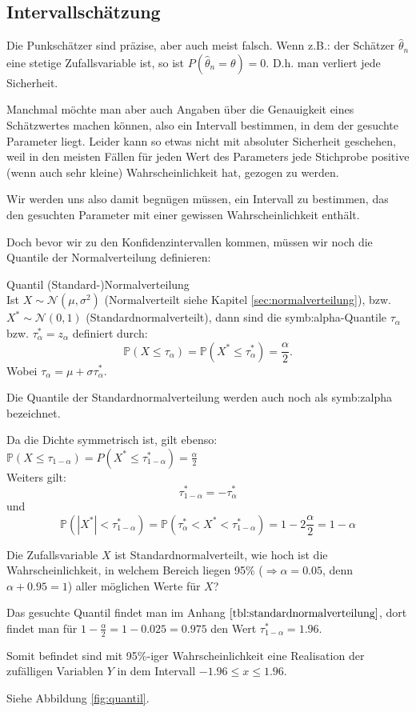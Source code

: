 
\subsection{Intervallschätzung}
Die Punkschätzer sind präzise, aber auch meist falsch. Wenn z.B.: der Schätzer $\hat\theta_n$ eine stetige Zufallsvariable ist, so ist $P(\hat\theta_n=\theta)=0$. D.h. man verliert jede Sicherheit.

Manchmal möchte man aber auch Angaben über die Genauigkeit eines Schätzwertes
machen können, also ein Intervall bestimmen, in dem der gesuchte Parameter
liegt. Leider kann so etwas nicht mit absoluter Sicherheit geschehen, weil
in den meisten Fällen für jeden Wert des Parameters jede Stichprobe
positive (wenn auch sehr kleine) Wahrscheinlichkeit hat, gezogen zu werden.

Wir werden uns also damit begnügen müssen, ein Intervall zu bestimmen,
das den gesuchten Parameter mit einer gewissen Wahrscheinlichkeit enthält.

Doch bevor wir zu den Konfidenzintervallen kommen, müssen wir noch die Quantile der Normalverteilung definieren:
\begin{definition}Quantil (Standard-)Normalverteilung\\\label{def:quantil_normalverteilung}
Ist $X\sim\mathcal N(\mu, \sigma^2)$ (Normalverteilt siehe Kapitel \ref{sec:normalverteilung}), bzw. $X^*\sim\mathcal N(0, 1)$ (Standardnormalverteilt), dann sind die \gls{symb:alpha}-Quantile $\tau_\alpha$ bzw. $\tau_\alpha^*=z_\alpha$ definiert durch:
\[\mathbb P(X\leq\tau_\alpha)=\mathbb P(X^*\leq\tau_\alpha^*)=\frac{\alpha}{2}.\]
Wobei $\tau_\alpha=\mu+\sigma\tau_\alpha^*$.

Die Quantile der Standardnormalverteilung werden auch noch als \gls{symb:zalpha} bezeichnet.
\end{definition}
Da die Dichte symmetrisch ist, gilt ebenso: $\mathbb P(X\leq\tau_{1-\alpha})=P(X^*\leq\tau_{1-\alpha}^*)=\frac{\alpha}{2}$\\
Weiters gilt: 
\[\tau_{1-\alpha}^*=-\tau_\alpha^*\]
und
\[\mathbb P(|X^*|<\tau_{1-\alpha}^*)=\mathbb P(\tau_\alpha^*<X^*<\tau_{1-\alpha}^*)=1-2\frac{\alpha}{2}=1-\alpha\]

\begin{bsp}\label{bsp:quantil}
Die Zufallsvariable $X$ ist Standardnormalverteilt, wie hoch ist die Wahrscheinlichkeit, in welchem Bereich liegen 95\% ($\Rightarrow \alpha=0.05$, denn $\alpha+0.95=1$) aller möglichen Werte für $X$?

Das gesuchte Quantil findet man im Anhang $\ref{tbl:standardnormalverteilung}$, dort findet man für $1-\frac{\alpha}{2}=1-0.025=0.975$ den Wert $\tau_{1-\alpha}^*=1.96$.

Somit befindet sind mit 95\%-iger Wahrscheinlichkeit eine Realisation der zufälligen Variablen $Y$ in dem Intervall $-1.96\leq x\leq 1.96$.

Siehe Abbildung \ref{fig:quantil}.
\end{bsp}

